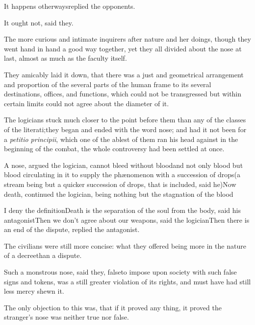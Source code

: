 \documentclass{article}
\begin{document}
\tsh It happens otherways\tsk replied the
opponents.\tsh

It ought not, said they.

The more curious and intimate inquirers after nature and her
doings, though they went hand in hand a good way together,
yet they all divided about the nose at last, almost as much
as the faculty itself.

\newpage
They amicably laid it down, that there was a just and
geometrical arrangement and proportion of the several parts of the
human frame to its several destinations, offices, and functions,
which could not be transgressed but within certain limits\tsk
{}
could not agree about the diameter of it.

The logicians stuck much closer to the point before them than
any of the classes of the literati;\tsh they began and
ended with the word nose; and had it not been for a \textit{petitio
principii}, which one of the ablest of them ran his head against
in the beginning of the combat, the whole controversy had been
settled at once.

A nose, argued the logician, cannot bleed without
blood\tsk and not only blood\pb
\tsk but blood circulating in it to
supply the phænomenon with a succession of drops\tsk (a
stream being but a quicker succession of drops, that is included,
said he)\tsk Now death, continued the logician, being
nothing but the stagnation of the blood\tsh

I deny the definition\tsh Death is the separation of
the soul from the body, said his antagonist\tsk Then we
don’t agree about our weapons, said the
logician\tsk Then there is an end of the dispute, replied the
antagonist.

The civilians were still more concise: what they offered being
more in the nature of a decree\tsk than a dispute.

\tsk Such a monstrous nose, said they, 
\pb 
false\tsk to impose upon society with such false signs and
tokens, was a still greater violation of its rights, and must have
had still less mercy shewn it.

The only objection to this was, that\break
if it proved any thing, it proved the\break
stranger’s nose was neither true nor false.
\end{document}

